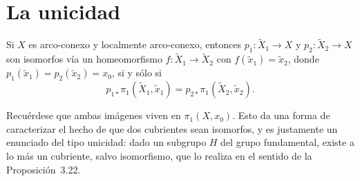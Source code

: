 \documentclass[11pt]{article}
\begin{document}
\section*{La unicidad}

\begin{prop}\label{prop:unicidad-cubrientes}
Si $X$ es arco-conexo y localmente arco-conexo, entonces $p_1\colon\tilde X_1\to X$ y $p_2\colon\tilde X_2\to X$ son isomorfos vía un homeomorfismo $f\colon\tilde X_1\to\tilde X_2$ con $f(\tilde x_1)=\tilde x_2$, donde $p_1(\tilde x_1)=p_2(\tilde x_2)=x_0$, si y sólo si
\[
  p_{1*}\pi_1(\tilde X_1,\tilde x_1)=p_{2*}\pi_1(\tilde X_2,\tilde x_2).
\]
\end{prop}

Recuérdese que ambas imágenes viven en $\pi_1(X,x_0)$. Esto da una forma de caracterizar el hecho de que dos cubrientes sean isomorfos, y es justamente un enunciado del tipo unicidad: dado un subgrupo $H$ del grupo fundamental, existe a lo más un cubriente, salvo isomorfismo, que lo realiza en el sentido de la Proposición~3.22.
\end{document}
